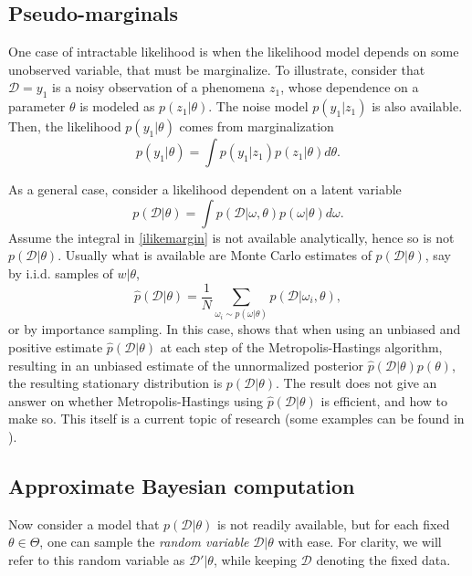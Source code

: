 \subsection{Pseudo-marginals}\label{pseudomarginalsection}
One case of intractable likelihood is when the likelihood model depends on some unobserved variable, that must be marginalize. To illustrate, consider that $\mathcal{D} = y_1$ is a noisy observation of a phenomena $z_1$, whose dependence on a parameter $\theta$ is modeled as $p(z_1|\theta)$. The noise model $p(y_1|z_1)$ is also available. Then, the likelihood $p(y_1|\theta)$ comes from marginalization 
\begin{displaymath}
p(y_1|\theta) = \int p(y_1|z_1) p(z_1|\theta) d\theta.
\end{displaymath}

As a general case, consider a likelihood dependent on a latent variable
\begin{equation}\label{ilikemargin}
 p(\mathcal{D}|\theta) = \int p(\mathcal{D}|\omega,\theta) p(\omega|\theta) d\omega.
\end{equation}
Assume the integral in \eqref{ilikemargin} is not available analytically, hence so is not $p(\mathcal{D}|\theta)$. Usually what is available are Monte Carlo estimates of $p(\mathcal{D}|\theta)$, say by i.i.d. samples of $w|\theta$,
\begin{equation}
 \hat{p}(\mathcal{D}|\theta) = \frac{1}{N} \sum_{\omega_i \sim p(\omega|\theta)} p(\mathcal{D}|\omega_i,\theta),
\end{equation}
or by importance sampling. In this case, \cite{Andrieu_2009} shows that when using an unbiased and positive estimate $\hat{p}(\mathcal{D}|\theta)$ at each step of the Metropolis-Hastings algorithm, resulting in an unbiased estimate of the unnormalized posterior $\hat{p}(\mathcal{D}|\theta)p(\theta)$, the resulting stationary distribution is $p(\mathcal{D}|\theta)$. The result does not give an answer on whether Metropolis-Hastings using $\hat{p}(\mathcal{D}|\theta)$ is efficient, and how to make so. This itself is a current topic of research (some examples can be found in \cite{Andrieu_2010,Sherlock_2015}).

\subsection{Approximate Bayesian computation}
Now consider a model that $p(\mathcal{D}|\theta)$ is not readily available, but for each fixed $\theta \in \Theta$, one can sample the \textit{random variable} $\mathcal{D}|\theta$ with ease. For clarity, we will refer to this random variable as $\mathcal{D}'|\theta$, while keeping $\mathcal{D}$ denoting the fixed data.

